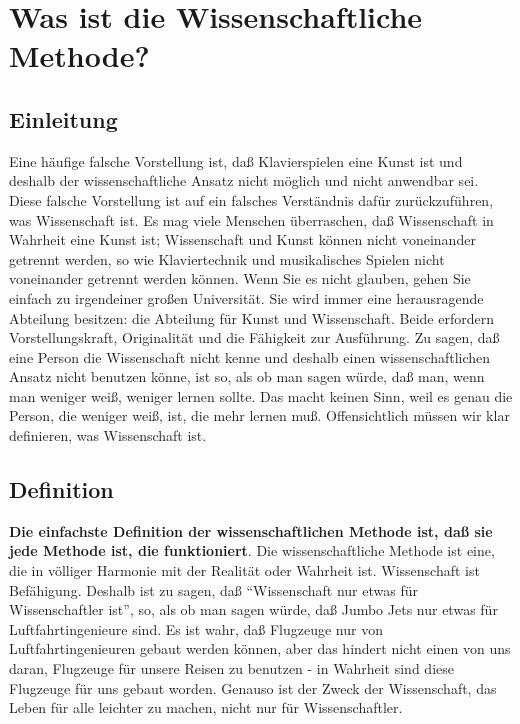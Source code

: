 \hypertarget{c3_3}{}

\section{Was ist die Wissenschaftliche Methode?}\hypertarget{c3_3a}{}

\subsection{Einleitung}

Eine häufige falsche Vorstellung ist, daß Klavierspielen eine Kunst ist und deshalb der wissenschaftliche Ansatz nicht möglich und nicht anwendbar sei.
 Diese falsche Vorstellung ist auf ein falsches Verständnis dafür zurückzuführen, was Wissenschaft ist.
 Es mag viele Menschen überraschen, daß Wissenschaft in Wahrheit eine Kunst ist; Wissenschaft und Kunst können nicht voneinander getrennt werden, so wie Klaviertechnik und musikalisches Spielen nicht voneinander getrennt werden können.
 Wenn Sie es nicht glauben, gehen Sie einfach zu irgendeiner großen Universität.
 Sie wird immer eine herausragende Abteilung besitzen: die Abteilung für Kunst und Wissenschaft.
 Beide erfordern Vorstellungskraft, Originalität und die Fähigkeit zur Ausführung.
 Zu sagen, daß eine Person die Wissenschaft nicht kenne und deshalb einen wissenschaftlichen Ansatz nicht benutzen könne, ist so, als ob man sagen würde, daß man, wenn man weniger weiß, weniger lernen sollte.
 Das macht keinen Sinn, weil es genau die Person, die weniger weiß, ist, die mehr lernen muß.
 Offensichtlich müssen wir klar definieren, was Wissenschaft ist.
 \hypertarget{c3_3b}{}

\subsection{Definition}

\textbf{Die einfachste Definition der wissenschaftlichen Methode ist, daß sie jede Methode ist, die funktioniert}.
 Die wissenschaftliche Methode ist eine, die in völliger Harmonie mit der Realität oder Wahrheit ist.
 Wissenschaft ist Befähigung.
 Deshalb ist zu sagen, daß \enquote{Wissenschaft nur etwas für Wissenschaftler ist}, so, als ob man sagen würde, daß Jumbo Jets nur etwas für Luftfahrtingenieure sind.
 Es ist wahr, daß  Flugzeuge nur von Luftfahrtingenieuren gebaut werden können, aber das hindert nicht einen von uns daran, Flugzeuge für unsere Reisen zu benutzen - in Wahrheit sind diese Flugzeuge für uns gebaut worden.
 Genauso ist der Zweck der Wissenschaft, das Leben für alle leichter zu machen, nicht nur für Wissenschaftler.
 

